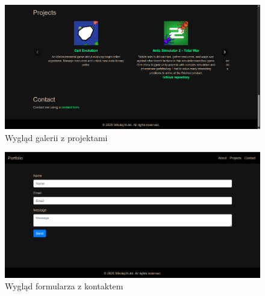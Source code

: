 \documentclass[a4paper,12pt]{article}
\begin{document}
\begin{figure}[H]
    \centering
    \includegraphics[width=1\textwidth]{images/gallery.png}
    \caption{Wygląd galerii z projektami}
\end{figure}

\begin{figure}[H]
    \centering
    \includegraphics[width=1\textwidth]{images/contact.png}
    \caption{Wygląd formularza z kontaktem}
\end{figure}
\end{document}
